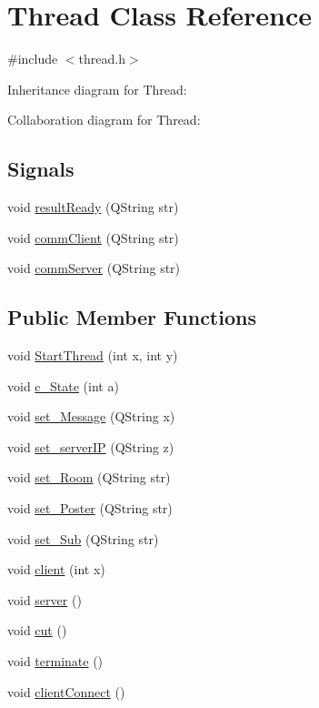 \hypertarget{class_thread}{}\section{Thread Class Reference}
\label{class_thread}


{\ttfamily \#include $<$thread.\+h$>$}



Inheritance diagram for Thread\+:


Collaboration diagram for Thread\+:
\subsection*{Signals}
\begin{DoxyCompactItemize}
\item 
void \mbox{\hyperlink{class_thread_aa850562d414991f4b235d23623902ce6}{result\+Ready}} (Q\+String str)
\item 
void \mbox{\hyperlink{class_thread_a263c49745ef39e51461339f482da6465}{comm\+Client}} (Q\+String str)
\item 
void \mbox{\hyperlink{class_thread_a3a648f8e1ca34baf6a9c9ce98d51f498}{comm\+Server}} (Q\+String str)
\end{DoxyCompactItemize}
\subsection*{Public Member Functions}
\begin{DoxyCompactItemize}
\item 
void \mbox{\hyperlink{class_thread_afc20a50819284acf6f225c0a1e8815a4}{Start\+Thread}} (int x, int y)
\item 
void \mbox{\hyperlink{class_thread_a9277677620d5ddb091b7b2c1bf06d3de}{c\+\_\+\+State}} (int a)
\item 
void \mbox{\hyperlink{class_thread_a162f450146da3365851a64da5ae88bcf}{set\+\_\+\+Message}} (Q\+String x)
\item 
void \mbox{\hyperlink{class_thread_a5f2ffa447921453d789057a0744a7f47}{set\+\_\+server\+IP}} (Q\+String z)
\item 
void \mbox{\hyperlink{class_thread_a7c9d9fa5e7a54311ef8ebcade4ea690f}{set\+\_\+\+Room}} (Q\+String str)
\item 
void \mbox{\hyperlink{class_thread_aa38bc77304c37909143ae577e607ead2}{set\+\_\+\+Poster}} (Q\+String str)
\item 
void \mbox{\hyperlink{class_thread_a4072fbf1a74fd7bac98765f02d238b5a}{set\+\_\+\+Sub}} (Q\+String str)
\item 
void \mbox{\hyperlink{class_thread_ac4eb870d2e959ed19546eb2776ccd4f0}{client}} (int x)
\item 
void \mbox{\hyperlink{class_thread_a295966eb0f2a153e131c0cadb4602aaa}{server}} ()
\item 
void \mbox{\hyperlink{class_thread_a01a6a634b4b993bf5ee53ccba4ad951d}{cut}} ()
\item 
void \mbox{\hyperlink{class_thread_a1ca03e56eccdb06ca9efb32cee4063b9}{terminate}} ()
\item 
void \mbox{\hyperlink{class_thread_a580dfe219e95afd325ddad77e2a59fef}{client\+Connect}} ()
\end{DoxyCompactItemize}
